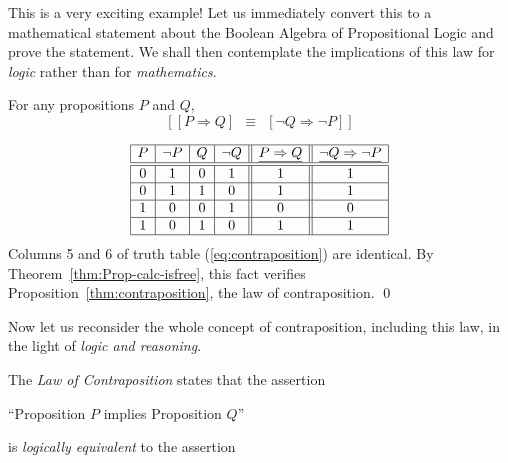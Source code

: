 
\smallskip

\noindent
This is a very exciting example!  Let us immediately convert this to a mathematical statement about the Boolean Algebra of Propositional Logic and prove the statement.  We shall then contemplate the implications of this law for {\em logic} rather than for {\em mathematics}.

\begin{prop}
\label{thm:contraposition}
For any propositions $P$ and $Q$,
\[  \left[ [ P \Rightarrow Q ] \ \ \equiv \ \ [ \neg Q
    \Rightarrow \neg P ] \right]
\]
\end{prop}

\begin{equation}
\label{eq:contraposition}
\begin{array}{|c|c|c|c||c||c|}
\hline
P & \neg P & Q & \neg Q & \underline{P \Rightarrow Q}
 & \underline{\neg Q \Rightarrow \neg P} \\
\hline
\hline
0 & 1 & 0 & 1 & 1 & 1 \\
\hline
0 & 1 & 1 & 0 & 1 & 1 \\
\hline
1 & 0 & 0 & 1 & 0 & 0 \\
\hline
1 & 0 & 1 & 0 & 1 & 1 \\
\hline
\end{array}
\end{equation}
Columns 5 and 6 of truth table (\ref{eq:contraposition}) are identical.  By Theorem~\ref{thm:Prop-calc-isfree}, this fact verifies Proposition~\ref{thm:contraposition}, the law of contraposition.  \qed

\smallskip

Now let us reconsider the whole concept of contraposition, including this law, in the light of {\em logic and reasoning}.

\medskip

The {\it Law of Contraposition} states that the assertion

\smallskip

\hspace*{.25in}
``Proposition $P$ implies Proposition $Q$''

\smallskip

\noindent
is {\em logically equivalent} to the assertion

\smallskip

